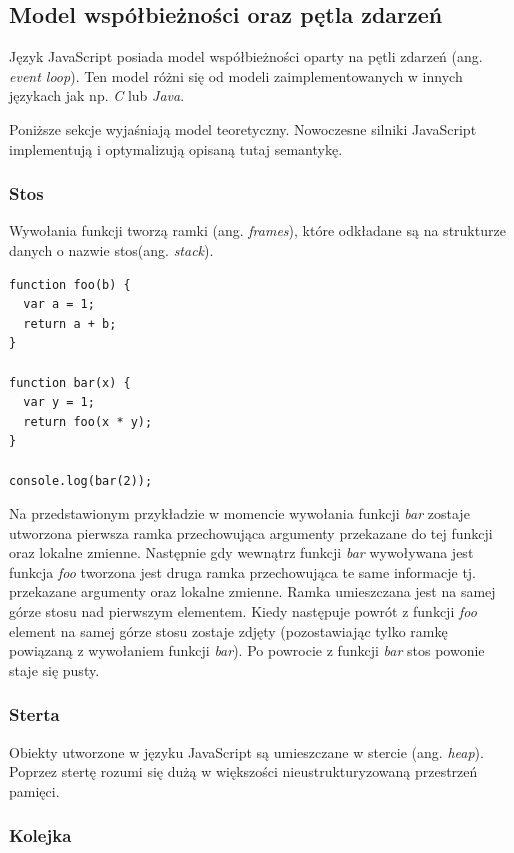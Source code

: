 \documentclass[polish, twoside, 12pt]{mwart}
\begin{document}
\subsection{Model współbieżności oraz pętla zdarzeń}

Język JavaScript posiada model współbieżności oparty na pętli zdarzeń (ang. \emph{event loop}). Ten model różni się od modeli zaimplementowanych w innych językach jak np. \emph{C} lub \emph{Java}.

Poniższe sekcje wyjaśniają model teoretyczny. Nowoczesne silniki JavaScript implementują i optymalizują opisaną tutaj semantykę.

\subsubsection{Stos}

Wywołania funkcji tworzą ramki (ang. \emph{frames}), które odkładane są na strukturze danych o nazwie stos(ang. \emph{stack}).

\begin{lstlisting}
function foo(b) {
  var a = 1;
  return a + b;
}

function bar(x) {
  var y = 1;
  return foo(x * y);
}

console.log(bar(2));
\end{lstlisting}

Na przedstawionym przykładzie w momencie wywołania funkcji \emph{bar} zostaje utworzona pierwsza ramka przechowująca argumenty przekazane do tej funkcji oraz lokalne zmienne. Następnie gdy wewnątrz funkcji \emph{bar} wywoływana jest funkcja \emph{foo} tworzona jest druga ramka przechowująca te same informacje tj. przekazane argumenty oraz lokalne zmienne. Ramka umieszczana jest na samej górze stosu nad pierwszym elementem. Kiedy następuje powrót z funkcji \emph{foo} element na samej górze stosu zostaje zdjęty (pozostawiając tylko ramkę powiązaną z wywołaniem funkcji \emph{bar}). Po powrocie z funkcji \emph{bar} stos powonie staje się pusty.

\subsubsection{Sterta}

Obiekty utworzone w języku JavaScript są umieszczane w stercie (ang. \emph{heap}). Poprzez stertę rozumi się dużą w większości nieustrukturyzowaną przestrzeń pamięci.

\subsubsection{Kolejka}
\end{document}
